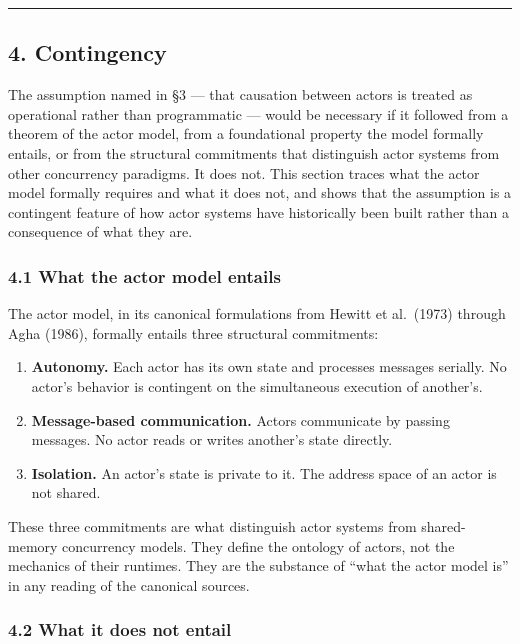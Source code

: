\documentclass[
]{article}
\providecommand{\tightlist}{%
  \setlength{\itemsep}{0pt}\setlength{\parskip}{0pt}}
\begin{document}
\begin{center}\rule{0.5\linewidth}{0.5pt}\end{center}

\subsection{4. Contingency}\label{contingency}

The assumption named in §3 --- that causation between actors is treated
as operational rather than programmatic --- would be necessary if it
followed from a theorem of the actor model, from a foundational property
the model formally entails, or from the structural commitments that
distinguish actor systems from other concurrency paradigms. It does not.
This section traces what the actor model formally requires and what it
does not, and shows that the assumption is a contingent feature of how
actor systems have historically been built rather than a consequence of
what they are.

\subsubsection{4.1 What the actor model
entails}\label{what-the-actor-model-entails}

The actor model, in its canonical formulations from Hewitt et al.~(1973)
through Agha (1986), formally entails three structural commitments:

\begin{enumerate}
\def\labelenumi{\arabic{enumi}.}
\tightlist
\item
  \textbf{Autonomy.} Each actor has its own state and processes messages
  serially. No actor's behavior is contingent on the simultaneous
  execution of another's.
\item
  \textbf{Message-based communication.} Actors communicate by passing
  messages. No actor reads or writes another's state directly.
\item
  \textbf{Isolation.} An actor's state is private to it. The address
  space of an actor is not shared.
\end{enumerate}

These three commitments are what distinguish actor systems from
shared-memory concurrency models. They define the ontology of actors,
not the mechanics of their runtimes. They are the substance of ``what
the actor model is'' in any reading of the canonical sources.

\subsubsection{4.2 What it does not
entail}\label{what-it-does-not-entail}
\end{document}
